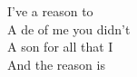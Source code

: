 I've  a reason to  \\
A de of me you didn't  \\
A son for all that I  \\
\songwordfb{} And the reason is  \\
